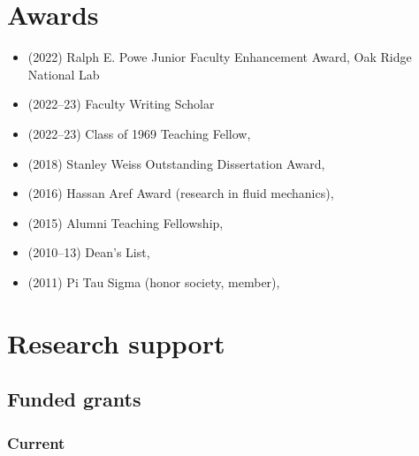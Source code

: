\section{Awards}

\begin{itemize}
    \item (2022) Ralph E. Powe Junior Faculty Enhancement Award, Oak Ridge National Lab
    \item (2022--23) \GT Faculty Writing Scholar
    \item (2022--23) Class of 1969 Teaching Fellow, \GIT
    \item (2018) Stanley Weiss Outstanding Dissertation Award, \UIUC
    \item (2016) Hassan Aref Award (research in fluid mechanics), \UIUC
    \item (2015) Alumni Teaching Fellowship, \UIUC
    \item (2010--13) Dean's List, \UMD
    \item (2011) Pi Tau Sigma (honor society, member), \UMD
\end{itemize}

\section{Research support}

% 

\subsection{Funded grants}

\subsubsection{Current}

